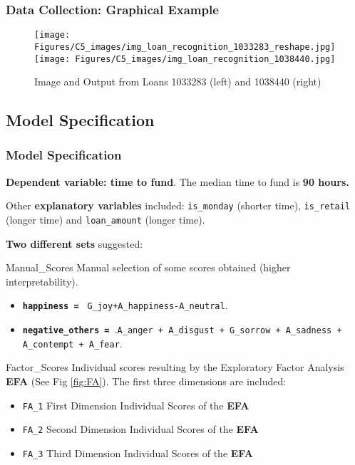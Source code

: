 \documentclass{beamer}
\begin{document}
\begin{frame}[plain]
\frametitle{Data Collection: Graphical Example}
\begin{figure}
\texttt{[image: Figures/C5\_images/img\_loan\_recognition\_1033283\_reshape.jpg]}%
\texttt{[image: Figures/C5\_images/img\_loan\_recognition\_1038440.jpg]}
\caption{Image and Output from Loans 1033283 (left) and 1038440 (right)}
\end{figure}
\end{frame}


\subsection{Model Specification}
\begin{frame}[plain]\frametitle{Model Specification}
\footnotesize{
\textbf{Dependent variable: time to fund}. The median time to fund is \textbf{90 hours.} \par
Other \textbf{explanatory variables} included: \texttt{is\_monday} (shorter time), \texttt{is\_retail} (longer time) and \texttt{loan\_amount} (longer time). \par
\textbf{Two different sets} suggested:

\begin{block}{Manual\_Scores}
Manual selection of some scores obtained (higher interpretability).
\begin{itemize}
\item \textbf{\texttt{happiness = }} \texttt{G\_joy+A\_happiness-A\_neutral}.
\item \textbf{\texttt{negative\_others = }}.\texttt{A\_anger + A\_disgust + G\_sorrow + A\_sadness + A\_contempt + A\_fear}.
\end{itemize}
\end{block}

\begin{block}{Factor\_Scores}
Individual scores resulting by the Exploratory Factor Analysis \textbf{EFA} (See Fig \ref{fig:FA}). The first three dimensions are included:
\begin{itemize}
\item \texttt{FA\_1} First Dimension Individual Scores of the \textbf{EFA}
\item \texttt{FA\_2} Second Dimension Individual Scores of the \textbf{EFA}
\item \texttt{FA\_3} Third Dimension Individual Scores of the \textbf{EFA}
\end{itemize}
\end{block}
}
\end{frame}
\end{document}

